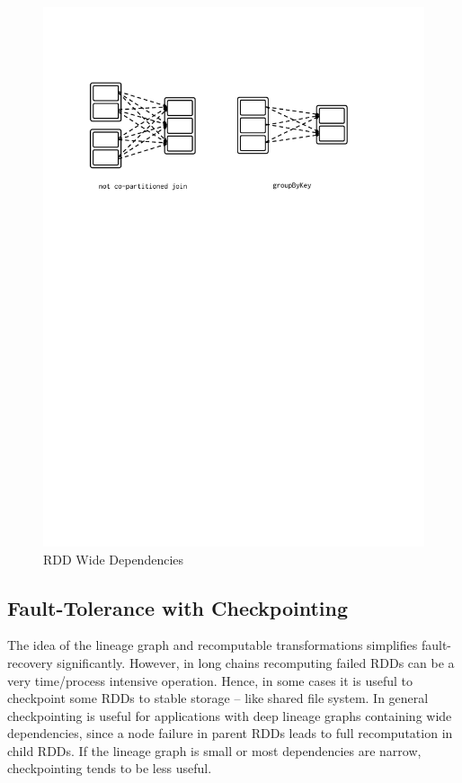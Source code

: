 \begin{itemize}
\begin{figure}[p]
        \includegraphics[clip,trim=2cm 19.5cm 3.5cm 4cm]{wide-dep.pdf}
        \caption[RDD Wide Dependencies]{RDD Wide Dependencies}
        \label{fig:sp:wide-dep}
    \end{figure}
\end{itemize}

\subsection{Fault-Tolerance with Checkpointing}
\label{sp:fault}

The idea of the lineage graph and recomputable transformations simplifies fault-recovery significantly. However, in long chains recomputing failed RDDs can be a very time/process intensive operation. Hence, in some cases it is useful to checkpoint some RDDs to stable storage -- like shared file system. In general checkpointing is useful for applications with deep lineage graphs containing wide dependencies, since a node failure in parent RDDs leads to full recomputation in child RDDs. If the lineage graph is small or most dependencies are narrow, checkpointing tends to be less useful. 

